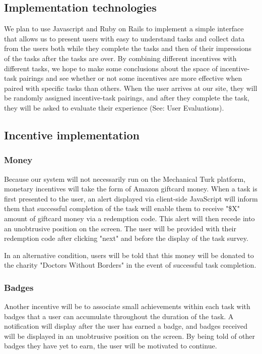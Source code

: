  \subsection{Implementation technologies}
We plan to use Javascript and Ruby on Rails to implement a simple interface that allows us to present users with easy to understand tasks and collect data from the users both while they complete the tasks and then of their impressions of the tasks after the tasks are over. By combining different incentives with different tasks, we hope to make some conclusions about the space of incentive-task pairings and see whether or not some incentives are more effective when paired with specific tasks than others. When the user arrives at our site, they will be randomly assigned incentive-task pairings, and after they complete the task, they will be asked to evaluate their experience (See: User Evaluations).
 
 \subsection{Incentive implementation}

\subsubsection{Money}
Because our system will not necessarily run on the Mechanical Turk platform, monetary incentives will take the form of Amazon giftcard money. When a task is first presented to the user, an alert displayed via client-side JavaScript will inform them that successful completion of the task will enable them to receive "\$X" amount of giftcard money via a redemption code. This alert will then recede into an unobtrusive position on the screen. The user will be provided with their redemption code after clicking "next" and before the display of the task survey.

In an alternative condition, users will be told that this money will be donated to the charity "Doctors Without Borders" in the event of successful task completion.
\subsubsection{Badges} 
Another incentive will be to associate small achievements within each task with badges that a user can accumulate throughout the duration of the task. A notification will display after the user has earned a badge, and badges received will be displayed in an unobtrusive position on the screen. By being told of other badges they have yet to earn, the user will be motivated to continue.
